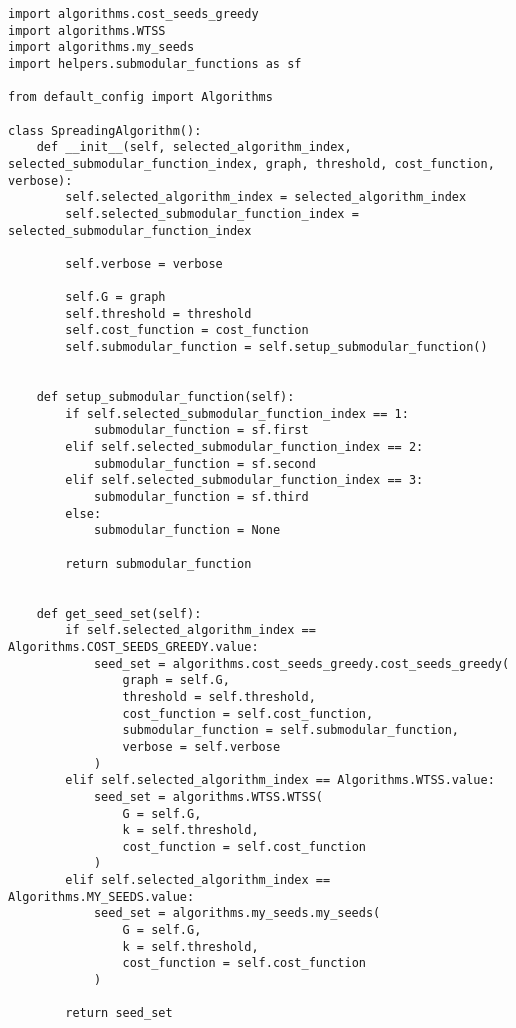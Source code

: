 \begin{code}
\begin{verbatim}
import algorithms.cost_seeds_greedy
import algorithms.WTSS
import algorithms.my_seeds
import helpers.submodular_functions as sf

from default_config import Algorithms

class SpreadingAlgorithm():
    def __init__(self, selected_algorithm_index, selected_submodular_function_index, graph, threshold, cost_function, verbose):
        self.selected_algorithm_index = selected_algorithm_index
        self.selected_submodular_function_index = selected_submodular_function_index

        self.verbose = verbose

        self.G = graph
        self.threshold = threshold
        self.cost_function = cost_function
        self.submodular_function = self.setup_submodular_function()


    def setup_submodular_function(self):
        if self.selected_submodular_function_index == 1:
            submodular_function = sf.first
        elif self.selected_submodular_function_index == 2:
            submodular_function = sf.second
        elif self.selected_submodular_function_index == 3:
            submodular_function = sf.third
        else:
            submodular_function = None

        return submodular_function


    def get_seed_set(self):
        if self.selected_algorithm_index == Algorithms.COST_SEEDS_GREEDY.value:
            seed_set = algorithms.cost_seeds_greedy.cost_seeds_greedy(
                graph = self.G,
                threshold = self.threshold,
                cost_function = self.cost_function, 
                submodular_function = self.submodular_function, 
                verbose = self.verbose
            )
        elif self.selected_algorithm_index == Algorithms.WTSS.value:
            seed_set = algorithms.WTSS.WTSS(
                G = self.G,
                k = self.threshold,
                cost_function = self.cost_function
            )
        elif self.selected_algorithm_index == Algorithms.MY_SEEDS.value:
            seed_set = algorithms.my_seeds.my_seeds(
                G = self.G,
                k = self.threshold,
                cost_function = self.cost_function
            )
        
        return seed_set
\end{verbatim}
\end{code}

